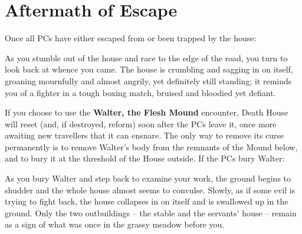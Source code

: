 \pagebreak
\section*{Aftermath of Escape}
\label{sec:AftermathOfEscape}
Once all PCs have either escaped from or been trapped by the house:
\begin{readout}
  As you stumble out of the house and race to the edge of the road, you turn to look back at whence you came.
  The house is crumbling and sagging in on itself, groaning mournfully and almost angrily, yet definitely still 
  standing; it reminds you of a fighter in a tough boxing match, bruised and bloodied yet defiant.
\end{readout}
If you choose to use the \textbf{Walter, the Flesh Mound} encounter, Death House will reset (and, if destroyed,
reform) soon after the PCs leave it, once more awaiting new travellers that it can ensnare. The only way to
remove its curse permanently is to remove Walter's body from the remnants of the Mound below, and to bury it
at the threshold of the House outside. If the PCs bury Walter:
\begin{readout}
  As you bury Walter and step back to examine your work, the ground begins to shudder and the whole house
  almost seems to convulse. Slowly, as if some evil is trying to fight back, the house collapses in on itself
  and is swallowed up in the ground. Only the two outbuildings -- the stable and the servants' house -- remain 
  as a sign of what was once in the grassy meadow before you.
\end{readout}

